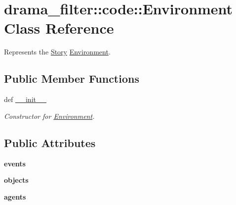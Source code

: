\hypertarget{classdrama__filter_1_1code_1_1Environment}{
\section{drama\_\-filter::code::Environment Class Reference}
\label{classdrama__filter_1_1code_1_1Environment}
}


Represents the \hyperlink{classdrama__filter_1_1code_1_1Story}{Story} \hyperlink{classdrama__filter_1_1code_1_1Environment}{Environment}.  


\subsection*{Public Member Functions}
\begin{DoxyCompactItemize}
\item 
def \hyperlink{classdrama__filter_1_1code_1_1Environment_adcc5a182d719390de44c38ba00d48a58}{\_\-\_\-init\_\-\_\-}
\begin{DoxyCompactList}\small\item\em Constructor for \hyperlink{classdrama__filter_1_1code_1_1Environment}{Environment}. \end{DoxyCompactList}\end{DoxyCompactItemize}
\subsection*{Public Attributes}
\begin{DoxyCompactItemize}
\item 
\hypertarget{classdrama__filter_1_1code_1_1Environment_a81c5e603ca527f3a5ff5637b63d388da}{
{\bfseries events}}
\label{classdrama__filter_1_1code_1_1Environment_a81c5e603ca527f3a5ff5637b63d388da}

\item 
\hypertarget{classdrama__filter_1_1code_1_1Environment_ad49a8fd2bb8fe61d469513da4a21aa62}{
{\bfseries objects}}
\label{classdrama__filter_1_1code_1_1Environment_ad49a8fd2bb8fe61d469513da4a21aa62}

\item 
\hypertarget{classdrama__filter_1_1code_1_1Environment_ad2fdd5ae4e30bcd7c8ad0cad3cb85f03}{
{\bfseries agents}}
\label{classdrama__filter_1_1code_1_1Environment_ad2fdd5ae4e30bcd7c8ad0cad3cb85f03}

\end{DoxyCompactItemize}


